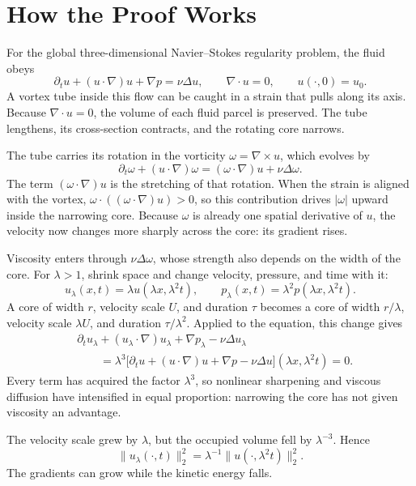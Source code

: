 \section*{How the Proof Works}

\begingroup
\setlength{\parskip}{0.38em}

For the global three-dimensional Navier--Stokes regularity problem, the fluid
obeys
\[
\partial_tu+(u\!\cdot\nabla)u+\nabla p=\nu\Delta u,
\qquad
\nabla\!\cdot u=0,
\qquad
u(\cdot,0)=u_0.
\]
A vortex tube inside this flow can be caught in a strain that pulls along its
axis. Because \(\nabla\!\cdot u=0\), the volume of each fluid parcel is
preserved. The tube lengthens, its cross-section contracts, and the rotating
core narrows.

The tube carries its rotation in the vorticity
\(\omega=\nabla\times u\), which evolves by
\[
\partial_t\omega+(u\!\cdot\nabla)\omega
=(\omega\!\cdot\nabla)u+\nu\Delta\omega.
\]
The term \((\omega\!\cdot\nabla)u\) is the stretching of that rotation. When
the strain is aligned with the vortex,
\(\omega\cdot((\omega\!\cdot\nabla)u)>0\), so this contribution drives
\(|\omega|\) upward inside the narrowing core. Because \(\omega\) is already
one spatial derivative of \(u\), the velocity now changes more sharply across
the core: its gradient rises.

Viscosity enters through \(\nu\Delta\omega\), whose strength also depends on
the width of the core. For \(\lambda>1\), shrink space and change velocity,
pressure, and time with it:
\[
u_\lambda(x,t)=\lambda u(\lambda x,\lambda^2t),
\qquad
p_\lambda(x,t)=\lambda^2p(\lambda x,\lambda^2t).
\]
A core of width \(r\), velocity scale \(U\), and duration \(\tau\) becomes a
core of width \(r/\lambda\), velocity scale \(\lambda U\), and duration
\(\tau/\lambda^2\). Applied to the equation, this change gives
\[
\begin{aligned}
&\partial_tu_\lambda
+(u_\lambda\!\cdot\nabla)u_\lambda
+\nabla p_\lambda-\nu\Delta u_\lambda\\
&\qquad
=\lambda^3
\bigl[\partial_tu+(u\!\cdot\nabla)u+\nabla p-\nu\Delta u\bigr]
(\lambda x,\lambda^2t)
=0.
\end{aligned}
\]
Every term has acquired the factor \(\lambda^3\), so nonlinear sharpening and
viscous diffusion have intensified in equal proportion: narrowing the core has
not given viscosity an advantage.

The velocity scale grew by \(\lambda\), but the occupied volume fell by
\(\lambda^{-3}\). Hence
\[
\|u_\lambda(\cdot,t)\|_2^2
=\lambda^{-1}\|u(\cdot,\lambda^2t)\|_2^2.
\]
The gradients can grow while the kinetic energy falls.


